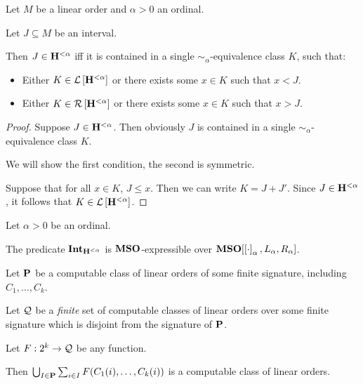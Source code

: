 \begin{lemma}\label{alpha-expressible}
  Let $M$ be a linear order and $\alpha > 0$ an ordinal.

  Let $J \subseteq M$ be an interval.

  Then $J \in \mathbf{H}_{}^{< \alpha}$ iff
  it is contained in a single $\sim_{\alpha}$-equivalence class $K$, such that:
  \begin{itemize}
    \item Either $K \in \mathcal{L} \left[ {{\mathbf{H}_{}^{< \alpha}}} \right]$ or
          there exists some $x \in K$ such that $x < J$.
    \item Either $K \in \mathcal{R} \left[ {{\mathbf{H}_{}^{< \alpha}}} \right]$ or
          there exists some $x \in K$ such that $x > J$.
  \end{itemize}
\end{lemma}

\begin{proof}
  Suppose $J \in \mathbf{H}_{}^{< \alpha}$.
  Then obviously $J$ is contained in a single $\sim_{\alpha}$-equivalence class $K$.

  We will show the first condition, the second is symmetric.

  Suppose that for all $x \in K$, $J \le x$.
  Then we can write $K = J + J'$.
  Since $J \in \mathbf{H}_{}^{< \alpha}$, it follows that $K \in \mathcal{L} \left[ {{\mathbf{H}_{}^{< \alpha}}} \right]$.
\end{proof}

\begin{corollary}\label{int-expressible}
  Let $\alpha > 0$ be an ordinal.

  The predicate $\mathbf{Int}_{\mathbf{H}_{}^{< \alpha}}$ is $\mathbf{MSO}$-expressible over
  $\mathbf{MSO}[\left[ {\cdot} \right]_{\alpha}, L_{\alpha}, R_{\alpha}]$.
\end{corollary}

\begin{theorem}\label{computable-sum}
  Let $\mathbf{P}$ be a computable class of linear orders of some finite signature,
  including $C_1, \ldots, C_k$.

  Let $\mathcal{Q}$ be a \emph{finite} set of computable classes of linear orders
  over some finite signature which is disjoint from the signature of $\mathbf{P}$.

  Let $F : 2^k \to \mathcal{Q}$ be any function.

  Then $\bigcup_{I \in \mathbf{P}} \sum_{i \in I} F(C_1(i), \ldots, C_k(i))$ is a computable class of linear orders.
\end{theorem}


